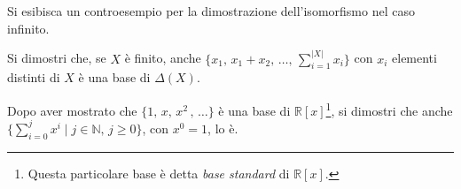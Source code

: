 \documentclass[a4paper]{article}
\begin{document}
\begin{exercise}
Si esibisca un controesempio per la dimostrazione dell'isomorfismo nel caso infinito.
\end{exercise}

\begin{exercise}
Si dimostri che, se $X$ è finito, anche $\{ x_1, \, x_1+x_2, \, \ldots, \, \sum_{i=1}^{|X|} x_i \}$ con $x_i$ elementi distinti
di $X$ è una base di $\Delta (X)$.
\end{exercise}

\begin{exercise}
Dopo aver mostrato che $\{ 1, \, x, \, x^2 \, , \, \ldots\}$ è una base di $\mathbb{R}[x]$\footnote{Questa particolare base è detta \textit{base standard} di $\mathbb{R}[x]$.},
si dimostri che anche $\{ \sum_{i=0}^{j} x^i \mid j \in \mathbb{N}, \, j \geq 0 \}$, con $x^0 = 1$, lo è.
\end{exercise}
\end{document}
